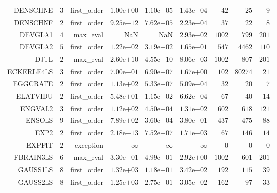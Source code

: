 \begin{longtable}{rrrrrrrrr}
DENSCHNE & \(     3\) & first\_order & \( 1.00\)e\(+00\) & \( 1.10\)e\(-05\) & \( 1.43\)e\(-04\) & \(    42\) & \(    25\) & \(     9\) \\
DENSCHNF & \(     2\) & first\_order & \( 9.25\)e\(-12\) & \( 7.62\)e\(-05\) & \( 2.23\)e\(-04\) & \(    37\) & \(    22\) & \(     8\) \\
DEVGLA1 & \(     4\) & max\_eval &       NaN &       NaN & \( 2.93\)e\(-02\) & \(  1002\) & \(   799\) & \(   201\) \\
DEVGLA2 & \(     5\) & first\_order & \( 1.22\)e\(-02\) & \( 3.19\)e\(-02\) & \( 1.65\)e\(-01\) & \(   547\) & \(  4462\) & \(   110\) \\
DJTL & \(     2\) & max\_eval & \( 2.60\)e\(+10\) & \( 4.55\)e\(+10\) & \( 8.06\)e\(-03\) & \(  1002\) & \(   807\) & \(   201\) \\
ECKERLE4LS & \(     3\) & first\_order & \( 7.00\)e\(-01\) & \( 6.90\)e\(-07\) & \( 1.67\)e\(+00\) & \(   102\) & \( 80274\) & \(    21\) \\
EGGCRATE & \(     2\) & first\_order & \( 1.13\)e\(+02\) & \( 5.33\)e\(-07\) & \( 5.09\)e\(-04\) & \(    32\) & \(    20\) & \(     7\) \\
ELATVIDU & \(     2\) & first\_order & \( 5.48\)e\(+01\) & \( 1.15\)e\(-02\) & \( 6.62\)e\(-04\) & \(    67\) & \(    40\) & \(    14\) \\
ENGVAL2 & \(     3\) & first\_order & \( 1.12\)e\(+02\) & \( 4.50\)e\(-04\) & \( 1.31\)e\(-02\) & \(   602\) & \(   618\) & \(   121\) \\
ENSOLS & \(     9\) & first\_order & \( 7.89\)e\(+02\) & \( 3.60\)e\(-04\) & \( 3.80\)e\(-01\) & \(   437\) & \(   475\) & \(    88\) \\
EXP2 & \(     2\) & first\_order & \( 2.18\)e\(-13\) & \( 7.52\)e\(-07\) & \( 1.71\)e\(-03\) & \(    67\) & \(   146\) & \(    14\) \\
EXPFIT & \(     2\) & exception & \(\infty\) & \(\infty\) & \(\infty\) & \(     0\) & \(     0\) & \(     0\) \\
FBRAIN3LS & \(     6\) & max\_eval & \( 3.30\)e\(-01\) & \( 4.99\)e\(-01\) & \( 2.92\)e\(+00\) & \(  1002\) & \(   601\) & \(   201\) \\
GAUSS1LS & \(     8\) & first\_order & \( 1.32\)e\(+03\) & \( 1.18\)e\(-01\) & \( 3.42\)e\(-02\) & \(   192\) & \(   115\) & \(    39\) \\
GAUSS2LS & \(     8\) & first\_order & \( 1.25\)e\(+03\) & \( 2.75\)e\(-01\) & \( 3.05\)e\(-02\) & \(   162\) & \(    97\) & \(    33\) \\

\end{longtable}
